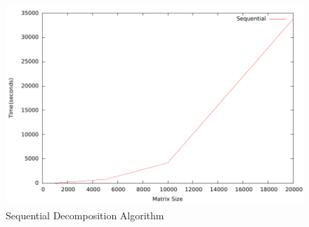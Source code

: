 \documentclass{article}
\begin{document}
\begin{figure}[H]
\begin{center}
\includegraphics[height=3in,width=5in]{Sequential/Plot.pdf}
\caption{Sequential Decomposition Algorithm}
\end{center}
\end{figure}
\end{document}
